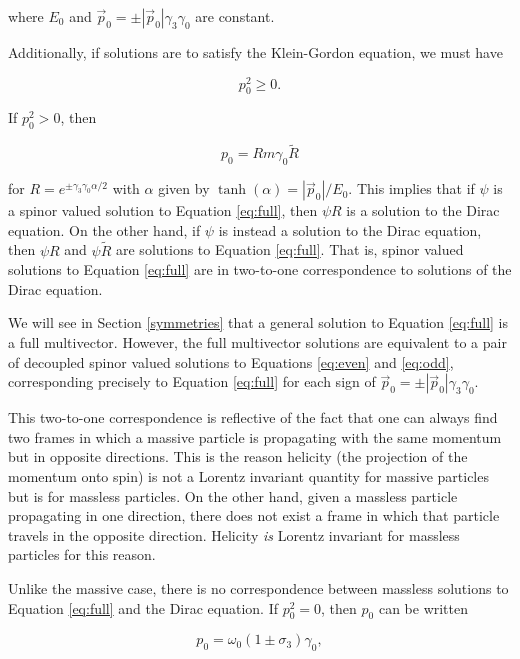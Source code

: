 \documentclass[twocolumn]{article}
\begin{document}
  where $E_0$ and $\vec p_0 = \pm |\vec p_0| \gamma_3 \gamma_0$ are constant.

  Additionally, if solutions are to satisfy the Klein-Gordon equation, we must have 

  \begin{equation}
    p_0^2 \geq 0.
  \end{equation}

  If $p_0^2 > 0$, then 

  \begin{equation}
    p_0 = R m \gamma_0 \widetilde R\label{eq:R}
  \end{equation} 

  for $R = e^{\pm \gamma_3 \gamma_0 \alpha/2}$ with $\alpha$ given by $\tanh(\alpha) = |\vec p_0|/E_0$. This implies that if $\psi$ is a spinor valued solution to Equation \ref{eq:full}, then $\psi R$ is a solution to the Dirac equation. On the other hand, if $\psi$ is instead a solution to the Dirac equation, then $\psi R$ and $\psi \widetilde R$ are solutions to Equation \ref{eq:full}. That is, spinor valued solutions to Equation \ref{eq:full} are in two-to-one correspondence to solutions of the Dirac equation. 

  We will see in Section \ref{symmetries} that a general solution to Equation \ref{eq:full} is a full multivector. However, the full multivector solutions are equivalent to a pair of decoupled spinor valued solutions to Equations \ref{eq:even} and \ref{eq:odd}, corresponding precisely to Equation \ref{eq:full} for each sign of $\vec p_0 = \pm |\vec p_0| \gamma_3 \gamma_0$.

  This two-to-one correspondence is reflective of the fact that one can always find two frames in which a massive particle is propagating with the same momentum but in opposite directions. This is the reason helicity (the projection of the momentum onto spin) is not a Lorentz invariant quantity for massive particles but is for massless particles. On the other hand, given a massless particle propagating in one direction, there does not exist a frame in which that particle travels in the opposite direction. Helicity \emph{is} Lorentz invariant for massless particles for this reason.

  Unlike the massive case, there is no correspondence between massless solutions to Equation \ref{eq:full} and the Dirac equation.  If $p_0^2 = 0$, then $p_0$ can be written

  \begin{equation}
    p_0 = \omega_0 (1 \pm \sigma_3) \gamma_0, \label{eq:massless}
  \end{equation}
\end{document}
